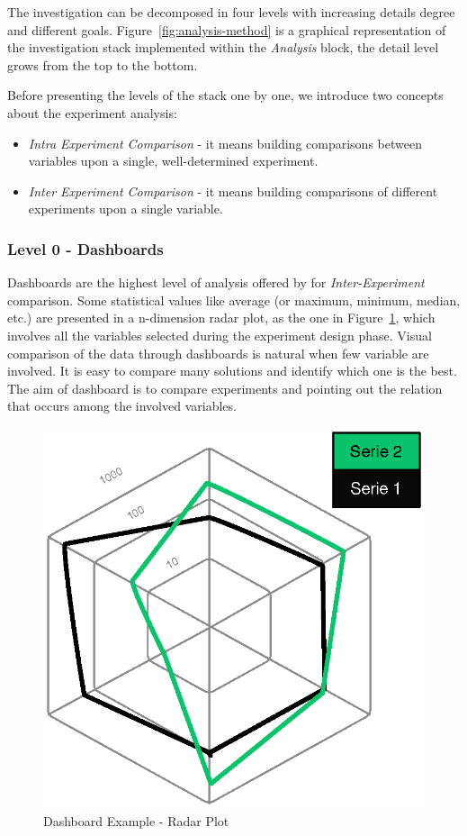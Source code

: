 The investigation can be decomposed in four levels with increasing details degree and different goals. Figure~\ref{fig:analysis-method} is a graphical representation of the investigation stack implemented within the \textit{Analysis} block, the detail level grows from the top to the bottom.

\noindent Before presenting the levels of the stack one by one, we introduce two concepts about the experiment analysis:
\begin{itemize}
\item \textit{Intra Experiment Comparison} -  it means building comparisons between variables upon a single, well-determined experiment.
\item \textit{Inter Experiment Comparison} -  it means building comparisons of different experiments upon a single variable. 
\end{itemize}

\pagebreak

\subsubsection{Level 0 - Dashboards}\label{sec:heaven-level0}

Dashboards are the highest level of analysis offered by \name for \textit{Inter-Experiment} comparison. Some statistical values like average (or maximum, minimum, median, etc.) are presented in a n-dimension radar plot, as the one in Figure~\ref{fig:radar}, which involves all the variables selected during the experiment design phase. Visual comparison of the data through dashboards is natural when few variable are involved. It is easy to compare many solutions and identify which one is the best. The aim of dashboard is to compare experiments and pointing out the relation that occurs among the involved variables.

\begin{figure}[tbh]
  \centering
	\includegraphics[width=0.5\linewidth]{images/radar-plot}
	\caption{Dashboard Example - Radar Plot} 	
  	\label{fig:radar}
\end{figure}

